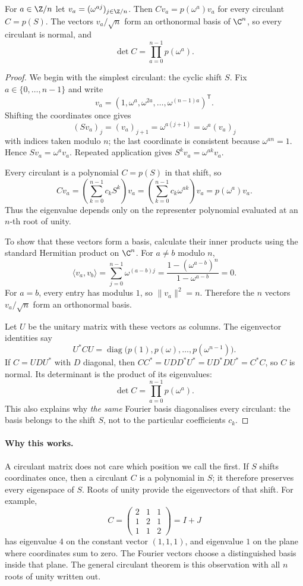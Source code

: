 \begin{theorem}\label{linear:thm:circulant}
For $a\in\Z/n$ let $v_a=(\omega^{aj})_{j\in\Z/n}$. Then $Cv_a=p(\omega^a)v_a$ for every circulant $C=p(S)$. The vectors
$v_a/\sqrt n$ form an orthonormal basis of $\C^n$, so every circulant is normal, and
\[
\det C=\prod_{a=0}^{n-1}p(\omega^a).
\]
\end{theorem}
\begin{proof}
We begin with the simplest circulant: the cyclic shift $S$. Fix $a\in\{0,\ldots,n-1\}$ and write
\[
v_a=(1,\omega^a,\omega^{2a},\ldots,\omega^{(n-1)a})^{\mathsf T}.
\]
Shifting the coordinates once gives
\[
(Sv_a)_j=(v_a)_{j+1}=\omega^{a(j+1)}
=\omega^a(v_a)_j
\]
with indices taken modulo $n$; the last coordinate is consistent because $\omega^{an}=1$. Hence $Sv_a=\omega^av_a$. Repeated application gives $S^kv_a=\omega^{ak}v_a$.

Every circulant is a polynomial $C=p(S)$ in that shift, so
\[
Cv_a=\left(\sum_{k=0}^{n-1}c_kS^k\right)v_a
=\left(\sum_{k=0}^{n-1}c_k\omega^{ak}\right)v_a
=p(\omega^a)v_a.
\]
Thus the eigenvalue depends only on the representer polynomial evaluated at an $n$-th root of unity.

To show that these vectors form a basis, calculate their inner products using the standard Hermitian product on $\C^n$. For $a\ne b$ modulo $n$,
\[
\langle v_a,v_b\rangle
=\sum_{j=0}^{n-1}\omega^{(a-b)j}
=\frac{1-(\omega^{a-b})^n}{1-\omega^{a-b}}=0.
\]
For $a=b$, every entry has modulus $1$, so $\|v_a\|^2=n$. Therefore the $n$ vectors $v_a/\sqrt n$ form an orthonormal basis.

Let $U$ be the unitary matrix with these vectors as columns. The eigenvector identities say
\[
U^*CU=\operatorname{diag}\bigl(p(1),p(\omega),\ldots,p(\omega^{n-1})\bigr).
\]
If $C=UDU^*$ with $D$ diagonal, then $CC^*=UDD^*U^*=UD^*DU^*=C^*C$,
so $C$ is normal. Its determinant is the product of its eigenvalues:
\[
\det C=\prod_{a=0}^{n-1}p(\omega^a).
\]
This also explains why \emph{the same} Fourier basis diagonalises every circulant: the basis belongs to the shift $S$, not to the particular coefficients $c_k$.
\end{proof}

\paragraph{Why this works.}
A circulant matrix does not care which position we call the first. If $S$ shifts coordinates once, then a circulant $C$ is a polynomial in $S$; it therefore preserves every eigenspace of $S$. Roots of unity provide the eigenvectors of that shift. For example,
\[
C=\begin{pmatrix}2&1&1\\1&2&1\\1&1&2\end{pmatrix}
=I+J
\]
has eigenvalue $4$ on the constant vector $(1,1,1)$, and eigenvalue $1$ on the plane where coordinates sum to zero. The Fourier vectors choose a distinguished basis inside that plane. The general circulant theorem is this observation with all $n$ roots of unity written out.

